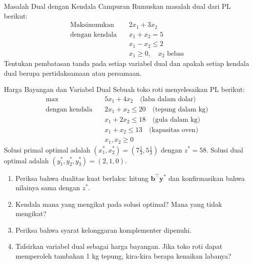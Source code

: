 \begin{ex}{Masalah Dual dengan Kendala Campuran}{}
 Rumuskan masalah dual dari PL berikut:
\[
\begin{aligned}
\text{Maksimumkan} \quad & 2x_1 + 3x_2 \\
\text{dengan kendala} \quad
& x_1 + x_2 = 5 \\
& x_1 - x_2 \leq 2 \\
& x_1 \geq 0, \quad x_2 \text{ bebas}
\end{aligned}
\]
Tentukan pembatasan tanda pada setiap variabel dual dan apakah setiap kendala dual berupa pertidaksamaan atau persamaan.
\exrefs{\S\ref{sec:duality-forms}}
\end{ex}

\begin{ex}{Harga Bayangan dan Variabel Dual}{}
 Sebuah toko roti menyelesaikan PL berikut:
\[
\begin{aligned}
\max \quad & 5x_1 + 4x_2 \quad \text{(laba dalam dolar)}\\
\text{dengan kendala} \quad
& 2x_1 + x_2 \leq 20 \quad \text{(tepung dalam kg)} \\
& x_1 + 2x_2 \leq 18 \quad \text{(gula dalam kg)} \\
& x_1 + x_2 \leq 13 \quad \text{(kapasitas oven)} \\
& x_1, x_2 \geq 0
\end{aligned}
\]
Solusi primal optimal adalah $(x_1^*, x_2^*) = (7\tfrac{1}{3}, 5\tfrac{1}{3})$ dengan $z^* = 58$.
Solusi dual optimal adalah $(y_1^*, y_2^*, y_3^*) = (2, 1, 0)$.

\begin{enumerate}
\item Periksa bahwa dualitas kuat berlaku: hitung $\mathbf{b}^\top \mathbf{y}^*$ dan konfirmasikan bahwa nilainya sama dengan $z^*$.
\item Kendala mana yang mengikat pada solusi optimal? Mana yang tidak mengikat?
\item Periksa bahwa syarat kelonggaran komplementer dipenuhi.
\item Tafsirkan variabel dual sebagai harga bayangan. Jika toko roti dapat memperoleh tambahan 1 kg tepung, kira-kira berapa kenaikan labanya?
\end{enumerate}
\end{ex}


